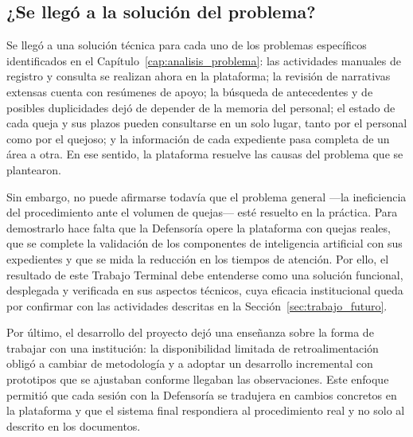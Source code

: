 \subsection*{¿Se llegó a la solución del problema?}

Se llegó a una solución técnica para cada uno de los problemas específicos identificados en el Capítulo~\ref{cap:analisis_problema}: las actividades manuales de registro y consulta se realizan ahora en la plataforma; la revisión de narrativas extensas cuenta con resúmenes de apoyo; la búsqueda de antecedentes y de posibles duplicidades dejó de depender de la memoria del personal; el estado de cada queja y sus plazos pueden consultarse en un solo lugar, tanto por el personal como por el quejoso; y la información de cada expediente pasa completa de un área a otra. En ese sentido, la plataforma resuelve las causas del problema que se plantearon.

Sin embargo, no puede afirmarse todavía que el problema general ---la ineficiencia del procedimiento ante el volumen de quejas--- esté resuelto en la práctica. Para demostrarlo hace falta que la Defensoría opere la plataforma con quejas reales, que se complete la validación de los componentes de inteligencia artificial con sus expedientes y que se mida la reducción en los tiempos de atención. Por ello, el resultado de este Trabajo Terminal debe entenderse como una solución funcional, desplegada y verificada en sus aspectos técnicos, cuya eficacia institucional queda por confirmar con las actividades descritas en la Sección~\ref{sec:trabajo_futuro}.

Por último, el desarrollo del proyecto dejó una enseñanza sobre la forma de trabajar con una institución: la disponibilidad limitada de retroalimentación obligó a cambiar de metodología y a adoptar un desarrollo incremental con prototipos que se ajustaban conforme llegaban las observaciones. Este enfoque permitió que cada sesión con la Defensoría se tradujera en cambios concretos en la plataforma y que el sistema final respondiera al procedimiento real y no solo al descrito en los documentos.
